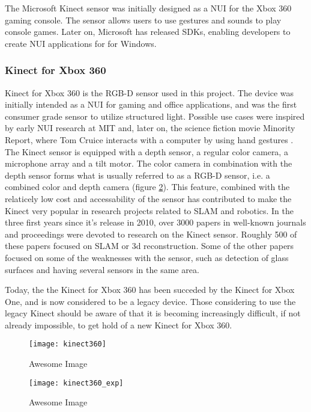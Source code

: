 The Microsoft Kinect sensor was initially designed as a \ac{NUI} for the Xbox 360 gaming console. The sensor allows users to use gestures and sounds to play console games. Later on, Microsoft has released SDKs, enabling developers to create \ac{NUI} applications for for Windows. 

\subsubsection{Kinect for Xbox 360}

Kinect for Xbox 360 is the RGB-D sensor used in this project. The device  was initially intended as a \ac{NUI} for gaming and office applications, and was the first consumer grade sensor to utilize structured light. Possible use cases were inspired by early \ac{NUI} research at \ac{MIT} and, later on, the science fiction movie Minority Report, where Tom Cruice interacts with a computer by using hand gestures \cite{kinect_book}. The Kinect sensor is equipped with a depth sensor, a regular color camera, a microphone array and a tilt motor. The color camera in combination with the depth sensor forms what is usually referred to as a RGB-D sensor, i.e. a combined color and depth camera (figure \ref{fig:kinect360_exp}). This feature, combined with the relaticely low cost and accessability of the sensor has contributed to make the Kinect very popular in research projects related to \ac{SLAM} and robotics. In the three first years since it's release in 2010, over 3000 papers in well-known journals and proceedings were devoted to research on the Kinect sensor. Roughly 500 of these papers focused on \ac{SLAM} or 3d reconstruction\cite{Berger2013}. Some of the other papers focused on some of the weaknesses with the sensor, such as detection of glass surfaces and having several sensors in the same area. 


Today, the the Kinect for Xbox 360 has been succeded by the Kinect for Xbox One, and is now considered to be a legacy device. Those considering to use the legacy Kinect should be aware of that it is becoming increasingly difficult, if not already impossible, to get hold of a new Kinect for Xbox 360. 

\begin{figure}[p]
    \centering
    \texttt{[image: kinect360]}
    \caption{Awesome Image}
    \label{fig:kinect360}
\end{figure}

\begin{figure}[p]
    \centering
    \texttt{[image: kinect360\_exp]}
    \caption{Awesome Image}
    \label{fig:kinect360_exp}
\end{figure}


